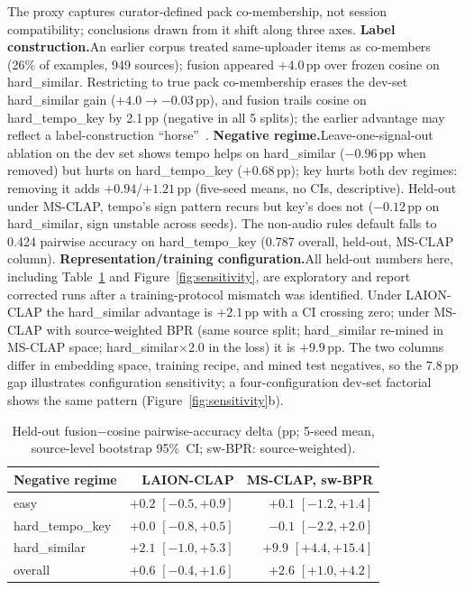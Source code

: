 \documentclass{article}
\begin{document}
The proxy captures curator-defined pack co-membership, not
session compatibility; conclusions drawn from it shift along
three axes.
%
\textbf{Label construction.}\enspace An earlier corpus treated
same-uploader items as co-members (26\% of examples, 949 sources);
fusion appeared $+4.0$\,pp over frozen cosine on hard\_similar.
Restricting to true pack co-membership erases the dev-set
hard\_similar gain ($+4.0 \to -0.03$\,pp), and fusion trails
cosine on hard\_tempo\_key by 2.1\,pp (negative in all 5 splits); the
earlier advantage may reflect a label-construction
``horse''~\cite{sturm2014horse}.
%
\textbf{Negative regime.}\enspace Leave-one-signal-out ablation
on the dev set shows tempo helps on hard\_similar ($-0.96$\,pp
when removed) but hurts on hard\_tempo\_key ($+0.68$\,pp);
key hurts both dev regimes: removing it adds
$+0.94$/$+1.21$\,pp (five-seed means, no CIs, descriptive).
Held-out under MS-CLAP, tempo's sign pattern recurs but key's
does not ($-0.12$\,pp on hard\_similar, sign unstable across
seeds).  The non-audio rules default falls to 0.424 pairwise
accuracy on hard\_tempo\_key (0.787 overall, held-out, MS-CLAP
column).
%
\textbf{Representation/training configuration.}\enspace All
held-out numbers here, including Table~\ref{tab:heldout} and
Figure~\ref{fig:sensitivity}, are exploratory and report
corrected runs after a training-protocol mismatch was identified.
Under LAION-CLAP the hard\_similar advantage is
$+2.1$\,pp with a CI crossing zero; under MS-CLAP
with source-weighted BPR (same source split; hard\_similar
re-mined in MS-CLAP space; hard\_similar$\times$2.0
in the loss) it is $+9.9$\,pp.  The two columns differ
in embedding space, training recipe, and mined test negatives,
so the $7.8$\,pp gap illustrates configuration
sensitivity; a four-configuration dev-set factorial shows the
same pattern (Figure~\ref{fig:sensitivity}b).

\begin{table}[t]
  \centering
  \scriptsize
  \renewcommand{\arraystretch}{0.95}
  \begin{tabular}{lrr}
    \toprule
    Negative regime & LAION-CLAP & MS-CLAP, sw-BPR \\
    \midrule
    easy            & $+0.2$ $[-0.5, +0.9]$ & $+0.1$ $[-1.2, +1.4]$ \\
    hard\_tempo\_key & $+0.0$ $[-0.8, +0.5]$ & $-0.1$ $[-2.2, +2.0]$ \\
    hard\_similar   & $+2.1$ $[-1.0, +5.3]$ & $+9.9$ $[+4.4, +15.4]$ \\
    \midrule
    overall         & $+0.6$ $[-0.4, +1.6]$ & $+2.6$ $[+1.0, +4.2]$ \\
    \bottomrule
  \end{tabular}
  \caption{Held-out fusion$-$cosine pairwise-accuracy delta (pp;
  5-seed mean, source-level bootstrap 95\%~CI; sw-BPR:
  source-weighted).}
  \vspace{-0.8cm}
  \label{tab:heldout}
\end{table}
\end{document}
